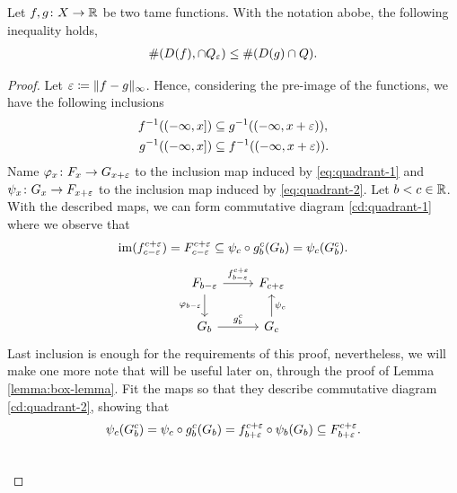 \begin{lemma} \label{lemma:quadrant-lemma}
    Let $f,g \colon X \to \mathbb R $ be two tame functions. With the notation abobe, the following inequality holds,
    \begin{align}
        \#(D(f), \cap Q_\varepsilon) \leq \#(D(g) \cap Q).
    \end{align}
\end{lemma}
\begin{proof}
    Let $ \varepsilon \coloneq \|f - g\|_\infty $. Hence, considering the pre-image of the functions, we have the following inclusions
    \begin{align}
        f^{-1}((-\infty, x]) &\subseteq g^{-1}((-\infty, x+\varepsilon)), \label{eq:quadrant-1}\\
        g^{-1}((-\infty, x]) &\subseteq f^{-1}((-\infty, x+\varepsilon)). \label{eq:quadrant-2}
    \end{align}
    Name $ \varphi_x \colon F_x \to G_{x+\varepsilon} $  to the inclusion map induced by \eqref{eq:quadrant-1} and $ \psi_x \colon G_x \to F_{x+\varepsilon} $ to the inclusion map induced by \eqref{eq:quadrant-2}. Let $ b<c \in \mathbb R $. With the described maps, we can form commutative diagram \eqref{cd:quadrant-1} where we observe that
    \begin{align} 
        \operatorname{im}(f_{c-\varepsilon}^{c+\varepsilon}) = F_{c-\varepsilon}^{c+\varepsilon} \subseteq \psi_c \circ g_b^c(G_b) = \psi_c (G_b^c).
    \end{align}
    \begin{equation} \label{cd:quadrant-1}
    \begin{tikzcd}
        F_{b-\e} \arrow[r, "f_{b-\e}^{c+\e}"] \arrow[d, "\varphi_{b-\e}"']
        & F_{c+\e} \\
        G_b \arrow[r, "g_b^c"]
        & G_c \arrow[u, "\psi_c"']        
    \end{tikzcd}
    \end{equation}
    Last inclusion is enough for the requirements of this proof, nevertheless, we will make one more note that will be useful later on, through the proof of Lemma \ref{lemma:box-lemma}. Fit the maps so that they describe commutative diagram \eqref{cd:quadrant-2}, showing that
    \begin{align}
        \psi_c(G_b^c) = \psi_c \circ g_b^c(G_b) = f_{b+\varepsilon}^{c+\varepsilon} \circ \psi_b(G_b) \subseteq F_{b+\varepsilon}^{c+\varepsilon}.
    \end{align}
    \begin{equation} \label{cd:quadrant-2}
    \begin{tikzcd}

\end{tikzcd}
\end{equation}
\end{proof}
